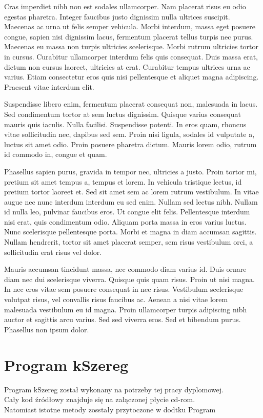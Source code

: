 \documentclass[twoside]{pracaInzynierskaMS}
\begin{document}
 Cras imperdiet nibh non est sodales ullamcorper. Nam placerat risus eu odio egestas pharetra. Integer faucibus justo dignissim nulla ultrices suscipit. Maecenas ac urna ut felis semper vehicula. Morbi interdum, massa eget posuere congue, sapien nisi dignissim lacus, fermentum placerat tellus turpis nec purus. Maecenas eu massa non turpis ultricies scelerisque. Morbi rutrum ultricies tortor in cursus. Curabitur ullamcorper interdum felis quis consequat. Duis massa erat, dictum non cursus laoreet, ultricies at erat. Curabitur tempus ultrices urna ac varius. Etiam consectetur eros quis nisi pellentesque et aliquet magna adipiscing. Praesent vitae interdum elit. 

 Suspendisse libero enim, fermentum placerat consequat non, malesuada in lacus. Sed condimentum tortor at sem luctus dignissim. Quisque varius consequat mauris quis iaculis. Nulla facilisi. Suspendisse potenti. In eros quam, rhoncus vitae sollicitudin nec, dapibus sed sem. Proin nisi ligula, sodales id vulputate a, luctus sit amet odio. Proin posuere pharetra dictum. Mauris lorem odio, rutrum id commodo in, congue et quam. 

 Phasellus sapien purus, gravida in tempor nec, ultricies a justo. Proin tortor mi, pretium sit amet tempus a, tempus et lorem. In vehicula tristique lectus, id pretium tortor laoreet et. Sed sit amet sem ac lorem rutrum vestibulum. In vitae augue nec nunc interdum interdum eu sed enim. Nullam sed lectus nibh. Nullam id nulla leo, pulvinar faucibus eros. Ut congue elit felis. Pellentesque interdum nisi erat, quis condimentum odio. Aliquam porta massa in eros varius luctus. Nunc scelerisque pellentesque porta. Morbi et magna in diam accumsan sagittis. Nullam hendrerit, tortor sit amet placerat semper, sem risus vestibulum orci, a sollicitudin erat risus vel dolor. 

 Mauris accumsan tincidunt massa, nec commodo diam varius id. Duis ornare diam nec dui scelerisque viverra. Quisque quis quam risus. Proin ut nisi magna. In nec eros vitae sem posuere consequat in nec risus. Vestibulum scelerisque volutpat risus, vel convallis risus faucibus ac. Aenean a nisi vitae lorem malesuada vestibulum eu id magna. Proin ullamcorper turpis adipiscing nibh auctor et sagittis arcu varius. Sed sed viverra eros. Sed et bibendum purus. Phasellus non ipsum dolor.
       
\section    {Program kSzereg}
Program kSzereg został wykonany na potrzeby tej pracy dyplomowej.\\
Cały kod źródłowy znajduje się na załączonej płycie cd-rom. \\
Natomiast istotne metody  zosstały przytoczone w dodtku Program
       
\end{document}
